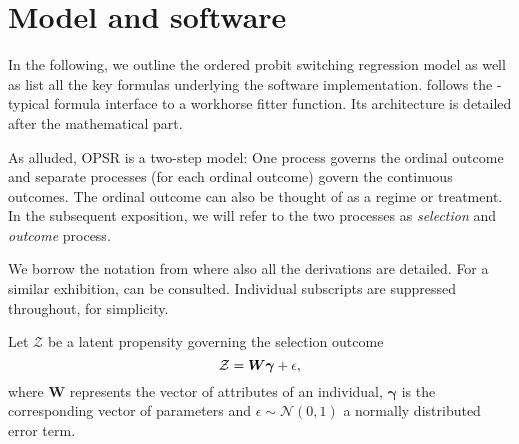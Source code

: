 \documentclass[%
    twoside, openright, titlepage, numbers=noenddot,%
    cleardoublepage=empty,%
    abstract=false,%
    BCOR=5.5mm, paper=a5, fontsize=10pt,%
]{scrreprt}
\begin{document}


\section{Model and software} \label{sec:model}

In the following, we outline the ordered probit switching regression model as well as list all the key formulas underlying the software implementation.  follows the -typical formula interface to a workhorse fitter function. Its architecture is detailed after the mathematical part.

As alluded, OPSR is a two-step model: One process governs the ordinal outcome and separate processes (for each ordinal outcome) govern the continuous outcomes. The ordinal outcome can also be thought of as a regime or treatment. In the subsequent exposition, we will refer to the two processes as \emph{selection} and \emph{outcome} process.

We borrow the notation from \cite{Wang+Mokhtarian:2024} where also all the derivations are detailed. For a similar exhibition, \citet{Chiburis+Lokshin:2007} can be consulted. Individual subscripts are suppressed throughout, for simplicity.

Let $\mathcal{Z}$ be a latent propensity governing the selection outcome
%
\begin{equation} \label{eq:selection}
\mathcal{Z} = \boldsymbol{W}\boldsymbol{\gamma} + \epsilon,
\end{equation}
%
where $\boldsymbol{W}$ represents the vector of attributes of an individual, $\boldsymbol{\gamma}$ is the corresponding vector of parameters and $\epsilon \sim \mathcal{N}(0, 1)$ a normally distributed error term.
\end{document}
